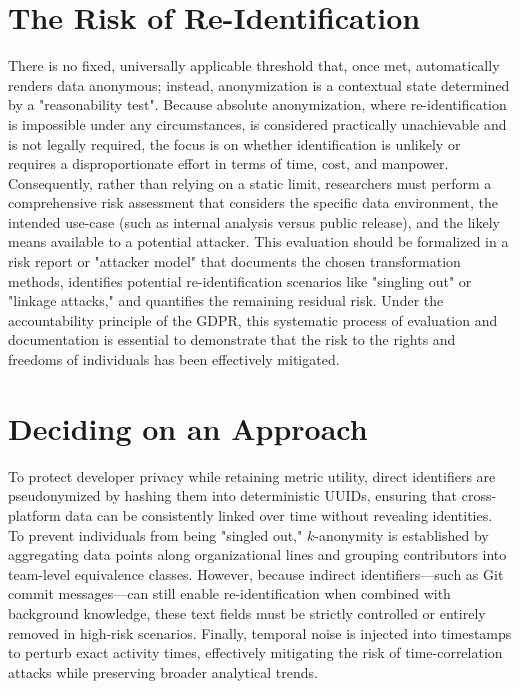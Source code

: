 \section{The Risk of Re-Identification}

There is no fixed, universally applicable threshold that, once met, automatically renders data anonymous; instead, anonymization is a contextual state determined by a "reasonability test". Because absolute anonymization, where re-identification is impossible under any circumstances, is considered practically unachievable and is not legally required, the focus is on whether identification is unlikely or requires a disproportionate effort in terms of time, cost, and manpower. Consequently, rather than relying on a static limit, researchers must perform a comprehensive risk assessment that considers the specific data environment, the intended use-case (such as internal analysis versus public release), and the likely means available to a potential attacker. This evaluation should be formalized in a risk report or "attacker model" that documents the chosen transformation methods, identifies potential re-identification scenarios like "singling out" or "linkage attacks," and quantifies the remaining residual risk. Under the accountability principle of the \ac{GDPR}, this systematic process of evaluation and documentation is essential to demonstrate that the risk to the rights and freedoms of individuals has been effectively mitigated.
\autocite[120, 124--132]{Krebs2022}
\autocite[18--19, 55, 60--61, 68--71]{gmdsbvd2024praxishilfe}
\autocite[5--6, 17, 25--26, 28--29, 60--61]{schwartmann2022praxisleitfaden}


\section{Deciding on an Approach}
\label{subsec:deciding_on_an_approach}

To protect developer privacy while retaining metric utility, direct identifiers are pseudonymized by hashing them into deterministic UUIDs, ensuring that cross-platform data can be consistently linked over time without revealing identities. To prevent individuals from being "singled out," $k$-anonymity is established by aggregating data points along organizational lines and grouping contributors into team-level equivalence classes. However, because indirect identifiers—such as Git commit messages—can still enable re-identification when combined with background knowledge, these text fields must be strictly controlled or entirely removed in high-risk scenarios. Finally, temporal noise is injected into timestamps to perturb exact activity times, effectively mitigating the risk of time-correlation attacks while preserving broader analytical trends. 

